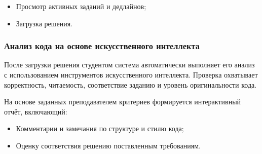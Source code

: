 \begin{itemize}
  \item Просмотр активных заданий и дедлайнов;
  \item Загрузка решения.
\end{itemize}

\subsubsection{Анализ кода на основе искусственного интеллекта}
После загрузки решения студентом система автоматически выполняет его анализ с использованием инструментов искусственного интеллекта. Проверка охватывает корректность, читаемость, соответствие заданию и уровень оригинальности кода.

На основе заданных преподавателем критериев формируется интерактивный отчёт, включающий:
\begin{itemize}
  \item Комментарии и замечания по структуре и стилю кода;
  \item Оценку соответствия решению поставленным требованиям.
\end{itemize}
